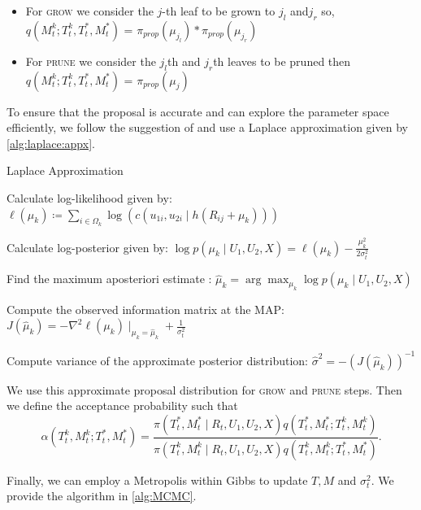 \documentclass{amsart}
\begin{document}
\begin{itemize}
	\item For \textsc{grow} we consider the $j$-th leaf to be grown to $j_l$ and$j_r$ so,
	$q\left(M_t^k;T_t^k, T_t^\ast, M_t^\ast\right)$ = $\pi_{prop}(\mu_{j_l})*\pi_{prop}(\mu_{j_r})$
	\item For \textsc{prune} we consider the $j_l$th and $j_r$th leaves to be pruned then $q\left(M_t^k;T_t^k, T_t^\ast, M_t^\ast\right)$ = $\pi_{prop}(\mu_j)$
\end{itemize}
To ensure that the proposal is accurate and can explore the parameter space efficiently, we follow the suggestion of \citet{Linero02012025} and use a Laplace approximation given by \cref{alg:laplace:appx}.

\begin{algorithm}[H]
	\caption{Laplace Approximation}\label{alg:laplace:appx}
	\begin{algorithmic}[1]
		\State Calculate log-likelihood given by: $\ell(\mu_k)\coloneqq\sum_{i\in \Omega_k}\log\left(c\left(u_{1i},u_{2i}\mid h\left(R_{ij}+\mu_k\right)\right)\right)$
		
		\State Calculate log-posterior given by: $\log p(\mu_k\mid U_1,U_2, X) = \ell(\mu_k) - \frac{\mu_k^2}{2\sigma_{t}^2}$
		
		\State Find the maximum aposteriori estimate : $\hat{\mu}_k = \arg\max_{\mu_k}\log p(\mu_k\mid U_1,U_2, X)$
		
		\State Compute the observed information matrix at the MAP:
		$J(\hat{\mu}_k) = -\nabla^2\ell(\mu_k)\mid_{\mu_k = \hat{\mu}_k}+\frac{1}{\sigma_t^2}$
		
		\State Compute variance of the approximate posterior distribution: $\hat{\sigma}^2 = -(J(\hat{\mu}_k))^{-1}$
		
	\end{algorithmic}
\end{algorithm}
We use this approximate proposal distribution for \textsc{grow} and \textsc{prune} steps. Then we define the acceptance probability such that
\begin{equation}\label{eq:acc:prob}
	\alpha\left(T_t^k,M_t^k;T_t^\ast, M_t^\ast\right)
	= \frac{\pi(T_t^\ast,M_t^\ast \mid R_t, U_1, U_2, X)q\left(T_t^\ast, M_t^\ast;T_t^k,M_t^k\right)}
	{\pi(T_t^k,M_t^k \mid R_t, U_1, U_2, X)q\left(T_t^k,M_t^k;T_t^\ast, M_t^\ast\right)}.
\end{equation}

Finally, we can employ a Metropolis within Gibbs to update $T,M$ and $\sigma_{t}^2$. We provide the algorithm in \cref{alg:MCMC}.
 
\end{document}
